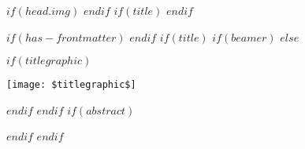 \pagestyle{fancy}
\fancyhead{} %
\renewcommand{\headrulewidth}{0pt}
$if(head.img)$
$endif$
$if(title)$
$endif$
\sectionfont{\color{odapred}\sectionrule{3ex}{0pt}{-1ex}{0.5pt}} %

$if(has-frontmatter)$
\frontmatter
$endif$
$if(title)$
$if(beamer)$
\frame{\titlepage}
$else$
{\color{odapred}\maketitle}
\vspace{0.5cm}
$if(titlegraphic)$
\centerline{\texttt{[image: \$titlegraphic\$]}}
\vspace{2cm}
$endif$
$endif$
$if(abstract)$
\begin{abstract}
$abstract$
\end{abstract}
$endif$
$endif$
